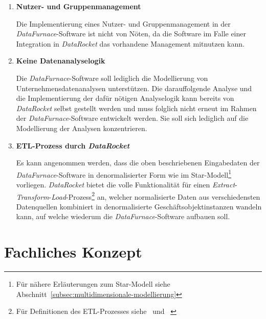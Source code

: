 \documentclass[
  language=german, %
  type=bachelor,%
  ngerman
]{isthesis}
\begin{document}
\begin{content}
  \begin{enumerate}
    \item \textbf{Nutzer- und Gruppenmanagement}

		Die Implementierung eines Nutzer- und Gruppenmanagement in der
		\textit{DataFurnace}-Software ist nicht von Nöten, da die Software im
		Falle einer Integration in \textit{DataRocket} das vorhandene Management
		mitnutzen kann.

    \item \textbf{Keine Datenanalyselogik}

      Die \textit{DataFurnace}-Software soll lediglich die Modellierung von
      Unternehmensdatenanalysen unterstützen. Die darauffolgende Analyse und
      die Implementierung der dafür nötigen Analyselogik kann bereits von
      \textit{DataRocket} selbst gestellt werden und muss folglich nicht erneut
      im Rahmen der \textit{DataFurnace}-Software entwickelt werden. Sie soll
      sich lediglich auf die Modellierung der Analysen konzentrieren.

    \item \textbf{\acrshort{ETL}-Prozess durch \textit{DataRocket}}

			Es kann angenommen werden, dass die oben beschriebenen Eingabedaten der
			\textit{DataFurnace}-Software in denormalisierter Form wie im
			Star-Modell\footnote{Für nähere Erläuterungen zum Star-Modell siehe
			Abschnitt~\ref{subsec:multidimensionale-modellierung}} vorliegen.
			\textit{DataRocket} bietet die volle Funktionalität für einen
			\textit{Extract}-\textit{Transform}-\textit{Load}-Prozess\footnote{Für
			Definitionen des ETL-Prozesses
			siehe~\textsc{\citeauthor{vassiliadis2002conceptual}}
			\citeyearpar{vassiliadis2002conceptual}
			und~\textsc{\citeauthor{trujillo2003uml}} \citeyearpar{trujillo2003uml}}
			an, welcher normalisierte Daten aus verschiedensten Datenquellen
			kombiniert in denormalisierte Geschäftsobjektinstanzen wandeln kann, auf
			welche wiederum die \textit{DataFurnace}-Software aufbauen soll.

  \end{enumerate}



  \section{Fachliches Konzept}


\end{content}
\end{document}
